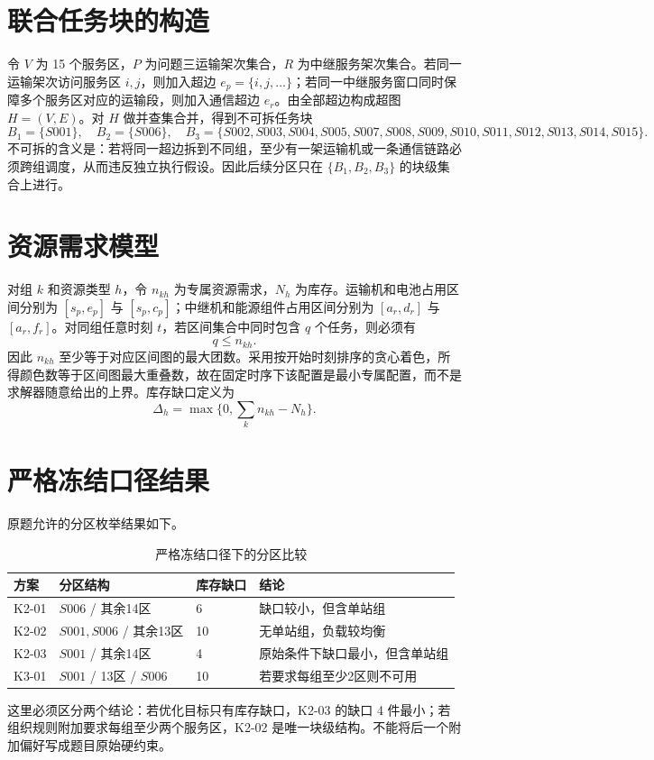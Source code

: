 \documentclass[UTF8,a4paper,12pt]{ctexart}
\begin{document}
\section{联合任务块的构造}
令 $V$ 为 15 个服务区，$P$ 为问题三运输架次集合，$R$ 为中继服务架次集合。若同一运输架次访问服务区 $i,j$，则加入超边 $e_p=\{i,j,\ldots\}$；若同一中继服务窗口同时保障多个服务区对应的运输段，则加入通信超边 $e_r$。由全部超边构成超图 $H=(V,E)$。对 $H$ 做并查集合并，得到不可拆任务块
\[
B_1=\{S001\},\quad B_2=\{S006\},\quad B_3=\{S002,S003,S004,S005,S007,S008,S009,S010,S011,S012,S013,S014,S015\}.
\]
不可拆的含义是：若将同一超边拆到不同组，至少有一架运输机或一条通信链路必须跨组调度，从而违反独立执行假设。因此后续分区只在 $\{B_1,B_2,B_3\}$ 的块级集合上进行。

\section{资源需求模型}
对组 $k$ 和资源类型 $h$，令 $n_{kh}$ 为专属资源需求，$N_h$ 为库存。运输机和电池占用区间分别为 $[s_p,e_p]$ 与 $[s_p,c_p]$；中继机和能源组件占用区间分别为 $[a_r,d_r]$ 与 $[a_r,f_r]$。对同组任意时刻 $t$，若区间集合中同时包含 $q$ 个任务，则必须有
\[
q\le n_{kh}.
\]
因此 $n_{kh}$ 至少等于对应区间图的最大团数。采用按开始时刻排序的贪心着色，所得颜色数等于区间图最大重叠数，故在固定时序下该配置是最小专属配置，而不是求解器随意给出的上界。库存缺口定义为
\[
\Delta_h=\max\{0,\sum_k n_{kh}-N_h\}.
\]

\section{严格冻结口径结果}
原题允许的分区枚举结果如下。
\begin{table}[H]\centering\caption{严格冻结口径下的分区比较}
\begin{tabular}{llll}\toprule
方案&分区结构&库存缺口&结论\\\midrule
K2-01&$S006$ / 其余14区&6&缺口较小，但含单站组\\
K2-02&$S001,S006$ / 其余13区&10&无单站组，负载较均衡\\
K2-03&$S001$ / 其余14区&4&原始条件下缺口最小，但含单站组\\
K3-01&$S001$ / 13区 / $S006$&10&若要求每组至少2区则不可用\\\bottomrule
\end{tabular}\end{table}

这里必须区分两个结论：若优化目标只有库存缺口，K2-03 的缺口 4 件最小；若组织规则附加要求每组至少两个服务区，K2-02 是唯一块级结构。不能将后一个附加偏好写成题目原始硬约束。
\end{document}
